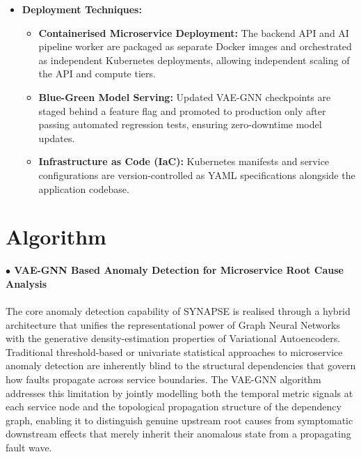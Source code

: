 \begin{itemize}
    \item \textbf{Deployment Techniques:}
    \begin{itemize}
        \item \textbf{Containerised Microservice Deployment:} The backend API and AI pipeline worker are packaged as separate Docker images and orchestrated as independent Kubernetes deployments, allowing independent scaling of the API and compute tiers.
        \item \textbf{Blue-Green Model Serving:} Updated VAE-GNN checkpoints are staged behind a feature flag and promoted to production only after passing automated regression tests, ensuring zero-downtime model updates.
        \item \textbf{Infrastructure as Code (IaC):} Kubernetes manifests and service configurations are version-controlled as YAML specifications alongside the application codebase.
    \end{itemize}

\end{itemize}

\section{Algorithm}

\noindent\textbf{\large $\bullet$ VAE-GNN Based Anomaly Detection for Microservice Root Cause Analysis}\\\\

\hspace*{0.3in} The core anomaly detection capability of SYNAPSE is realised through a hybrid architecture that unifies the representational power of Graph Neural Networks with the generative density-estimation properties of Variational Autoencoders. Traditional threshold-based or univariate statistical approaches to microservice anomaly detection are inherently blind to the structural dependencies that govern how faults propagate across service boundaries. The VAE-GNN algorithm addresses this limitation by jointly modelling both the temporal metric signals at each service node and the topological propagation structure of the dependency graph, enabling it to distinguish genuine upstream root causes from symptomatic downstream effects that merely inherit their anomalous state from a propagating fault wave.\\\\

